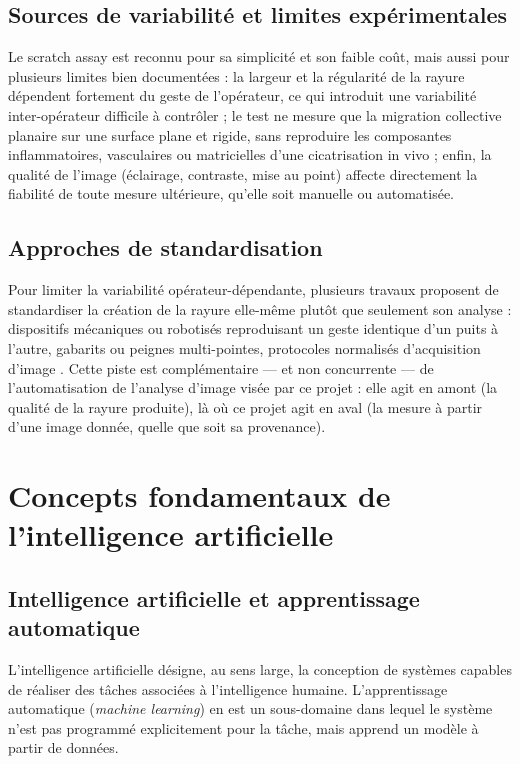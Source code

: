 \documentclass[12pt,a4paper]{report}
\begin{document}
\subsection{Sources de variabilité et limites expérimentales}

Le scratch assay est reconnu pour sa simplicité et son faible coût, mais aussi pour plusieurs limites bien documentées \cite{ref13,ref18} : la largeur et la régularité de la rayure dépendent fortement du geste de l'opérateur, ce qui introduit une variabilité inter-opérateur difficile à contrôler ; le test ne mesure que la migration collective planaire sur une surface plane et rigide, sans reproduire les composantes inflammatoires, vasculaires ou matricielles d'une cicatrisation in vivo ; enfin, la qualité de l'image (éclairage, contraste, mise au point) affecte directement la fiabilité de toute mesure ultérieure, qu'elle soit manuelle ou automatisée.

\subsection{Approches de standardisation}

Pour limiter la variabilité opérateur-dépendante, plusieurs travaux proposent de standardiser la création de la rayure elle-même plutôt que seulement son analyse : dispositifs mécaniques ou robotisés reproduisant un geste identique d'un puits à l'autre, gabarits ou peignes multi-pointes, protocoles normalisés d'acquisition d'image \cite{ref18}. Cette piste est complémentaire — et non concurrente — de l'automatisation de l'analyse d'image visée par ce projet : elle agit en amont (la qualité de la rayure produite), là où ce projet agit en aval (la mesure à partir d'une image donnée, quelle que soit sa provenance).

\section{Concepts fondamentaux de l'intelligence artificielle}
\label{sec:ia}

\subsection{Intelligence artificielle et apprentissage automatique}

L'intelligence artificielle désigne, au sens large, la conception de systèmes capables de réaliser des tâches associées à l'intelligence humaine. L'apprentissage automatique (\textit{machine learning}) en est un sous-domaine dans lequel le système n'est pas programmé explicitement pour la tâche, mais apprend un modèle à partir de données.
\end{document}

